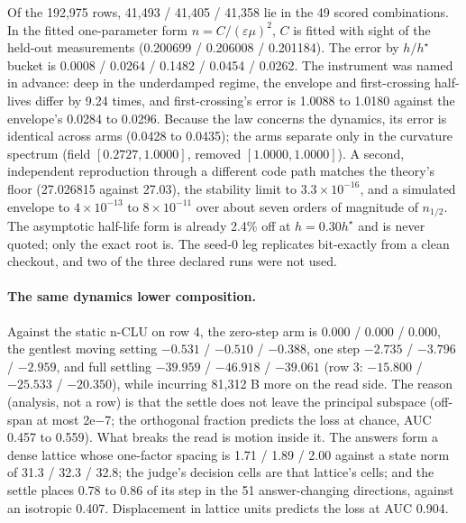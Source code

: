 \documentclass{article} %
\newcommand{\sci}[2]{\ensuremath{#1\times10^{#2}}}
\begin{document}
\noindent Of the 192,975 rows, 41,493 / 41,405 / 41,358 lie in the 49 scored combinations. In the fitted
one-parameter form $n=C/(\varepsilon\mu)^2$, $C$ is fitted with sight of the held-out measurements
(0.200699 / 0.206008 / 0.201184). %
The error by $h/h^\star$ bucket is 0.0008 / 0.0264 / 0.1482 / 0.0454 / 0.0262. The instrument was
named in advance: deep in the underdamped regime, the envelope and first-crossing half-lives differ
by 9.24 times, and first-crossing's error is 1.0088 to 1.0180 against the envelope's 0.0284 to 0.0296.
Because the law concerns the dynamics, its error is identical across arms (0.0428 to 0.0435); the
arms separate only in the curvature spectrum (field $[0.2727, 1.0000]$, removed $[1.0000, 1.0000]$).
A second, independent reproduction through a different code path matches the theory's floor
(27.026815 against 27.03), the stability limit to \sci{3.3}{-16}, and a simulated envelope to
\sci{4}{-13} to \sci{8}{-11} over about seven orders of magnitude of $n_{1/2}$. The asymptotic
half-life form is already 2.4\% off at $h=0.30h^\star$ and is never quoted; only the exact root is.
The seed-0 leg replicates bit-exactly from a clean checkout, and two of the three declared runs
were not used. %

\paragraph{The same dynamics lower composition.} Against the static n-CLU on row 4, the zero-step
arm is $0.000$ / $0.000$ / $0.000$, the gentlest moving setting $-0.531$ / $-0.510$ / $-0.388$, one
step $-2.735$ / $-3.796$ / $-2.959$, and full settling $-39.959$ / $-46.918$ / $-39.061$ (row 3:
$-15.800$ / $-25.533$ / $-20.350$), while incurring 81,312 B more on the read side.
The reason (analysis, not a row) is that the settle does not leave the principal subspace (off-span
at most 2e$-$7; the orthogonal fraction predicts the loss at chance, AUC 0.457 to 0.559). What breaks
the read is motion inside it. The answers form a dense lattice whose one-factor spacing is 1.71 / 1.89 /
2.00 against a state norm of 31.3 / 32.3 / 32.8; the judge's decision cells are that lattice's
cells; and the settle places 0.78 to 0.86 of its step in the 51 answer-changing directions, against
an isotropic 0.407. Displacement in lattice units predicts the loss at AUC 0.904.
\end{document}
